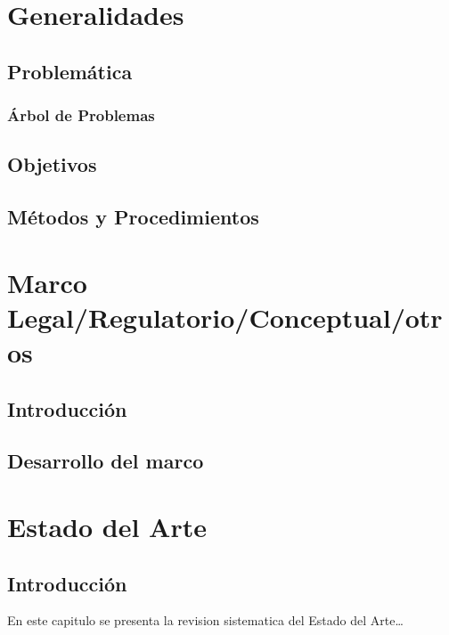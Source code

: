 \documentclass{report}
\begin{document}


\begin{abstract}

\end{abstract}

\tableofcontents

\cleardoublepage{}
\listoffigures

\cleardoublepage{}
\listoftables


\chapter{Generalidades}
\section{Problemática}
\subsection{Árbol de Problemas}
\section{Objetivos}
\section{Métodos y Procedimientos}

\chapter{Marco Legal/Regulatorio/Conceptual/otros}
\section{Introducción}
\section{Desarrollo del marco}


\chapter{Estado del Arte}

\section{Introducción}
En este capitulo se presenta la revision sistematica del Estado del Arte\ldots
\end{document}
